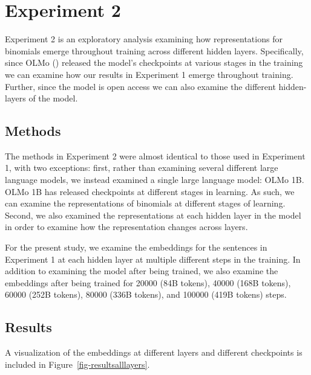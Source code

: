 \documentclass[
  12pt,
  letterpaper,
]{scrreport}
\begin{document}
\section{Experiment 2}\label{experiment-2-2}

Experiment 2 is an exploratory analysis examining how representations
for binomials emerge throughout training across different hidden layers.
Specifically, since OLMo
() released the model's checkpoints at various stages in the
training we can examine how our results in Experiment 1 emerge
throughout training. Further, since the model is open access we can also
examine the different hidden-layers of the model.

\subsection{Methods}\label{methods-9}

The methods in Experiment 2 were almost identical to those used in
Experiment 1, with two exceptions: first, rather than examining several
different large language models, we instead examined a single large
language model: OLMo 1B. OLMo 1B has released checkpoints at different
stages in learning. As such, we can examine the representations of
binomials at different stages of learning. Second, we also examined the
representations at each hidden layer in the model in order to examine
how the representation changes across layers.

For the present study, we examine the embeddings for the sentences in
Experiment 1 at each hidden layer at multiple different steps in the
training. In addition to examining the model after being trained, we
also examine the embeddings after being trained for 20000 (84B tokens),
40000 (168B tokens), 60000 (252B tokens), 80000 (336B tokens), and
100000 (419B tokens) steps.

\subsection{Results}\label{results-9}

A visualization of the embeddings at different layers and different
checkpoints is included in Figure~\ref{fig-resultsalllayers}.
\end{document}
